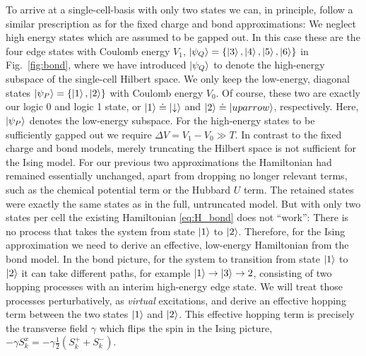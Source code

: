 To arrive at a single-cell-basis with only two states we can, in principle,
follow a similar prescription as for the fixed charge and bond approximations:
We neglect high energy states which are assumed to be gapped out. In this case
these are the four edge states with Coulomb energy $V_1$, $\left|\psi_Q\right> =
\left\{ \left|3\right>, \left|4\right>, \left|5\right>, \left|6\right> \right\}$ in Fig.~\ref{fig:bond},
where we have introduced $\left|\psi_Q\right>$ to denote the high-energy subspace of
the single-cell Hilbert space. We only keep the low-energy, diagonal states
$\left|\psi_P\right> = \left\{ \left|1\right>, \left|2\right> \right\}$ with Coulomb energy $V_0$. Of
course, these two are exactly our logic 0 and logic 1 state, or $\left|1\right> \doteq
\left|\downarrow\right>$ and $\left|2\right> \doteq \left|uparrow\right>$, respectively.  Here,
$\left|\psi_P\right>$ denotes the low-energy subspace. For the high-energy states to be
sufficiently gapped out we require $\Delta V = V_1 - V_0 \gg T$. In contrast to
the fixed charge and bond models, merely truncating the Hilbert space is not
sufficient for the Ising model. For our previous two approximations the
Hamiltonian had remained essentially unchanged, apart from dropping no longer
relevant terms, such as the chemical potential term or the Hubbard $U$ term. The
retained states were exactly the same states as in the full, untruncated model.
But with only two states per cell the existing Hamiltonian \eqref{eq:H_bond}
does not ``work'': There is no process that takes the system from state
$\left|1\right>$ to $\left|2\right>$. Therefore, for the Ising approximation we need to derive
an effective, low-energy Hamiltonian from the bond model. In the bond picture,
for the system to transition from state $\left|1\right>$ to $\left|2\right>$ it can take
different paths, for example $\left|1\right> \rightarrow \left|3\right> \rightarrow{2}$,
consisting of two hopping processes with an interim high-energy edge state. We
will treat those processes perturbatively, as \emph{virtual} excitations, and
derive an effective hopping term between the two states $\left|1\right>$ and $\left|2\right>$.
This effective hopping term is precisely the transverse field $\gamma$ which
flips the spin in the Ising picture, $-\gamma S^x_k = -\gamma \frac{1}{2} \left(
S^+_k + S^-_k \right)$.

